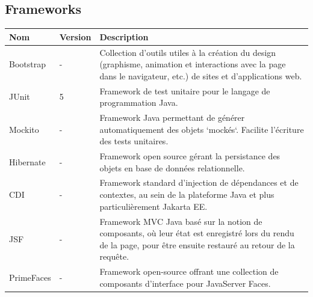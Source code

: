 \subsection{\textbf{Frameworks}}
\noindent
\begin{tabular}{!{\color{white}\vrule}m{3.4cm}!{\color{white}\vrule}m{1.7cm}!{\color{white}\vrule}m{10.8cm}!{\color{white}\vrule}}


\hline
 \color{white} Nom & \color{white} Version & \color{white} Description\\

\hline
{} Bootstrap & - & Collection d'outils utiles à la création du design (graphisme, animation et interactions avec la page dans le navigateur, etc.) de sites et d'applications web. \\

\hline
{} JUnit & 5 & Framework de test unitaire pour le langage de programmation Java. \\

\hline
{} Mockito & - & Framework Java permettant de générer automatiquement des objets ‘mockés‘. Facilite l’écriture des tests unitaires. \\

\hline
{} Hibernate & - & Framework open source gérant la persistance des objets en base de données relationnelle. \\

\hline
{} CDI & - & Framework standard d'injection de dépendances et de contextes, au sein de la plateforme Java et plus particulièrement Jakarta EE. \\

\hline
{} JSF & - & Framework MVC Java basé sur la notion de composants, où leur état est enregistré lors du rendu de la page, pour être ensuite restauré au retour de la requête.   \\

\hline
{} PrimeFaces & - & Framework open-source offrant une collection de composants d'interface pour JavaServer Faces.  \\

\hline

\end{tabular}

